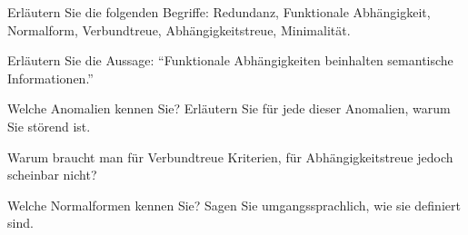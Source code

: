 \begin{fragen}
	\begin{enumeration}
		\item Erläutern Sie die folgenden Begriffe: Redundanz, Funktionale Abhängigkeit, Normalform, Verbundtreue, Abhängigkeitstreue, Minimalität.
		\item Erläutern Sie die Aussage: ``Funktionale Abhängigkeiten beinhalten semantische Informationen.''
		\item Welche Anomalien kennen Sie? Erläutern Sie für jede dieser Anomalien, warum Sie störend ist.
		\item Warum braucht man für Verbundtreue Kriterien, für Abhängigkeitstreue jedoch scheinbar nicht?
		\item Welche Normalformen kennen Sie? Sagen Sie umgangssprachlich, wie sie definiert sind.
	\end{enumeration}
\end{fragen}